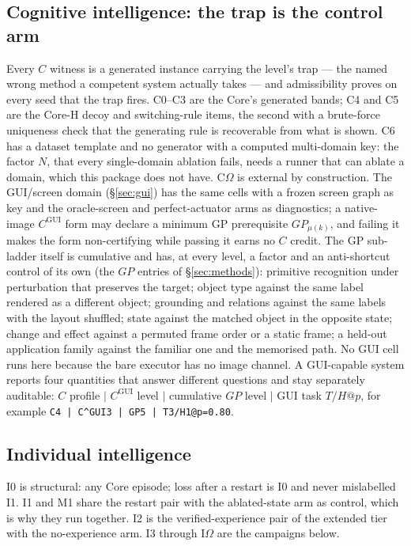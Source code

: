 \subsection{Cognitive intelligence: the trap is the control arm}
Every $C$ witness is a generated instance carrying the level's trap --- the named wrong method a competent system actually takes --- and admissibility proves on every seed that the trap fires. C0--C3 are the Core's generated bands; C4 and C5 are the Core-H decoy and switching-rule items, the second with a brute-force uniqueness check that the generating rule is recoverable from what is shown. C6 has a dataset template and no generator with a computed multi-domain key: the factor $N$, that every single-domain ablation fails, needs a runner that can ablate a domain, which this package does not have. C$\Omega$ is external by construction. The GUI/screen domain (\S\ref{sec:gui}) has the same cells with a frozen screen graph as key and the oracle-screen and perfect-actuator arms as diagnostics; a native-image $C^{\mathrm{GUI}}$ form may declare a minimum GP prerequisite $GP_{\mu(k)}$, and failing it makes the form non-certifying while passing it earns no $C$ credit. The GP sub-ladder itself is cumulative and has, at every level, a factor and an anti-shortcut control of its own (the $GP$ entries of \S\ref{sec:methods}): primitive recognition under perturbation that preserves the target; object type against the same label rendered as a different object; grounding and relations against the same labels with the layout shuffled; state against the matched object in the opposite state; change and effect against a permuted frame order or a static frame; a held-out application family against the familiar one and the memorised path. No GUI cell runs here because the bare executor has no image channel. A GUI-capable system reports four quantities that answer different questions and stay separately auditable: $C$ profile $\mid$ $C^{\mathrm{GUI}}$ level $\mid$ cumulative $GP$ level $\mid$ GUI task $T/H@p$, for example \texttt{C4 | C\^{}GUI3 | GP5 | T3/H1@p=0.80}.

\subsection{Individual intelligence}
I0 is structural: any Core episode; loss after a restart is I0 and never mislabelled I1. I1 and M1 share the restart pair with the ablated-state arm as control, which is why they run together. I2 is the verified-experience pair of the extended tier with the no-experience arm. I3 through I$\Omega$ are the campaigns below.

